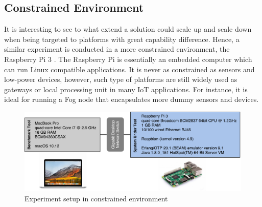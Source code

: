 


\subsection{Constrained Environment}

It is interesting to see to what extend a solution could scale up and scale down when being targeted to platforms with great capability difference. Hence, a similar experiment is conducted in a more constrained environment, the Raspberry Pi 3 \autocite{raspberry_pi}. The Raspberry Pi is essentially an embedded computer which can run Linux compatible applications. It is never as constrained as sensors and low-power devices, however, such type of platforms are still widely used as gateways or local processing unit in many IoT applications. For instance, it is ideal for running a Fog node that encapsulates more dummy sensors and devices.

\begin{figure}[!htbp]
\centering
\includegraphics[scale = 0.6]{experiment_setting_rasp}
\caption{Experiment setup in constrained environment}
\label{fig:experiment_setting_rasp}
\end{figure}

